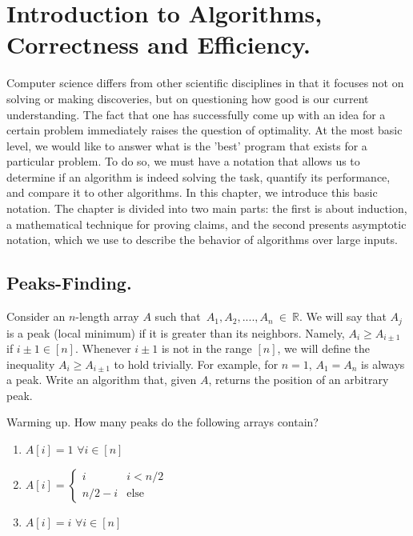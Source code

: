

\chapter{Introduction to Algorithms, Correctness and Efficiency.}
Computer science differs from other scientific disciplines in that it focuses not on solving or making discoveries, but on questioning how good is our current understanding. The fact that one has successfully come up with an idea for a certain problem immediately raises the question of optimality. At the most basic level, we would like to answer what is the 'best'  program that exists for a particular problem. To do so, we must have a notation that allows us to determine if an algorithm is indeed solving the task, quantify its performance, and compare it to other algorithms. In this chapter, we introduce this basic notation. The chapter is divided into two main parts: the first is about induction, a mathematical technique for proving claims, and the second presents asymptotic notation, which we use to describe the behavior of algorithms over large inputs.

\section{Peaks-Finding.}
\begin{example}
Consider an \(n\)-length array $A$ such that~$A_1,A_2,....,A_n~\in~\mathbb{R}$. We will say that $A_{j}$ is a peak (local minimum) if it is greater than its neighbors. Namely, $A_{i} \ge A_{i\pm1}$ if $i\pm 1 \in [n]$. Whenever $i\pm 1$ is not in the range $[n]$, we will define the inequality $A_{i} \ge A_{i\pm 1}$ to hold trivially. For example, for $n=1$, $A_{1}=A_{n}$ is always a peak. Write an algorithm that, given $A$, returns the position of an arbitrary peak.
\end{example}


\begin{example}{Warming up.} How many peaks do the following arrays contain?
  \begin{enumerate}
    \item $A[i] = 1$   $\forall i \in [n]$
    \item $A[i] = \begin{cases}
        i & i < n/2 \\
        n/2 - i & \text{else}
      \end{cases}$
    \item $A[i] = i $  $\forall i \in [n]$
  \end{enumerate}
\end{example}

